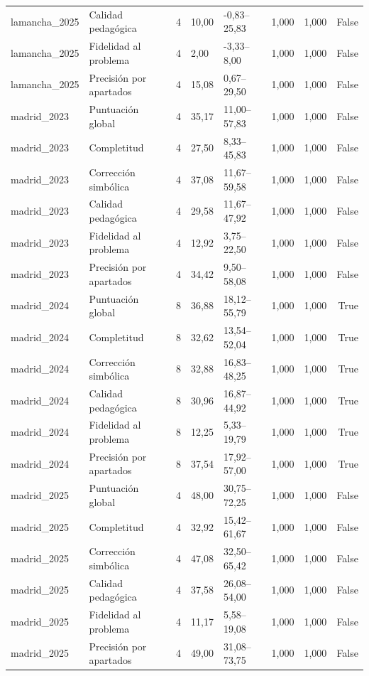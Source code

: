 \begin{tabular}{llrllllr}
lamancha\_2025 & Calidad pedagógica & 4 & 10,00 & -0,83–25,83 & 1,000 & 1,000 & False \\
lamancha\_2025 & Fidelidad al problema & 4 & 2,00 & -3,33–8,00 & 1,000 & 1,000 & False \\
lamancha\_2025 & Precisión por apartados & 4 & 15,08 & 0,67–29,50 & 1,000 & 1,000 & False \\
madrid\_2023 & Puntuación global & 4 & 35,17 & 11,00–57,83 & 1,000 & 1,000 & False \\
madrid\_2023 & Completitud & 4 & 27,50 & 8,33–45,83 & 1,000 & 1,000 & False \\
madrid\_2023 & Corrección simbólica & 4 & 37,08 & 11,67–59,58 & 1,000 & 1,000 & False \\
madrid\_2023 & Calidad pedagógica & 4 & 29,58 & 11,67–47,92 & 1,000 & 1,000 & False \\
madrid\_2023 & Fidelidad al problema & 4 & 12,92 & 3,75–22,50 & 1,000 & 1,000 & False \\
madrid\_2023 & Precisión por apartados & 4 & 34,42 & 9,50–58,08 & 1,000 & 1,000 & False \\
madrid\_2024 & Puntuación global & 8 & 36,88 & 18,12–55,79 & 1,000 & 1,000 & True \\
madrid\_2024 & Completitud & 8 & 32,62 & 13,54–52,04 & 1,000 & 1,000 & True \\
madrid\_2024 & Corrección simbólica & 8 & 32,88 & 16,83–48,25 & 1,000 & 1,000 & True \\
madrid\_2024 & Calidad pedagógica & 8 & 30,96 & 16,87–44,92 & 1,000 & 1,000 & True \\
madrid\_2024 & Fidelidad al problema & 8 & 12,25 & 5,33–19,79 & 1,000 & 1,000 & True \\
madrid\_2024 & Precisión por apartados & 8 & 37,54 & 17,92–57,00 & 1,000 & 1,000 & True \\
madrid\_2025 & Puntuación global & 4 & 48,00 & 30,75–72,25 & 1,000 & 1,000 & False \\
madrid\_2025 & Completitud & 4 & 32,92 & 15,42–61,67 & 1,000 & 1,000 & False \\
madrid\_2025 & Corrección simbólica & 4 & 47,08 & 32,50–65,42 & 1,000 & 1,000 & False \\
madrid\_2025 & Calidad pedagógica & 4 & 37,58 & 26,08–54,00 & 1,000 & 1,000 & False \\
madrid\_2025 & Fidelidad al problema & 4 & 11,17 & 5,58–19,08 & 1,000 & 1,000 & False \\
madrid\_2025 & Precisión por apartados & 4 & 49,00 & 31,08–73,75 & 1,000 & 1,000 & False \\

\end{tabular}
